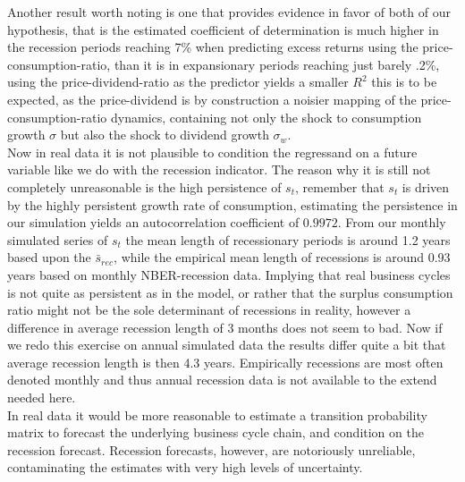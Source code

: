 Another result worth noting is one that provides evidence in favor of both of our hypothesis, that is the estimated coefficient of determination is much higher in the recession periods reaching 7\% when predicting excess returns using the price-consumption-ratio, than it is in expansionary periods reaching just barely .2\%, using the price-dividend-ratio as the predictor yields a smaller $R^2$ this is to be expected, as the price-dividend is by construction a noisier mapping of the price-consumption-ratio dynamics, containing not only the shock to consumption growth $\sigma$ but also the shock to dividend growth $\sigma_w$.\\

Now in real data it is not plausible to condition the regressand on a future variable like we do with the recession indicator. The reason why it is still not completely unreasonable is the high persistence of $s_t$, remember that $s_t$ is driven by the highly persistent growth rate of consumption, estimating the persistence in our simulation yields an autocorrelation coefficient of $0.9972$. From our monthly simulated series of $s_t$ the mean length of recessionary periods is around 1.2 years based upon the $\bar{s}_{rec}$, while the empirical mean length of recessions is around 0.93 years based on monthly NBER-recession data. Implying that real business cycles is not quite as persistent as in the model, or rather that the surplus consumption ratio might not be the sole determinant of recessions in reality, however a difference in average recession length of 3 months does not seem to bad.
Now if we redo this exercise on annual simulated data the results differ quite a bit that average recession length is then 4.3 years. Empirically recessions are most often denoted monthly and thus annual recession data is not available to the extend needed here.\\

In real data it would be more reasonable to estimate a transition probability matrix to forecast the underlying business cycle chain, and condition on the recession forecast. Recession forecasts, however, are notoriously unreliable, contaminating the estimates with very high levels of uncertainty.





